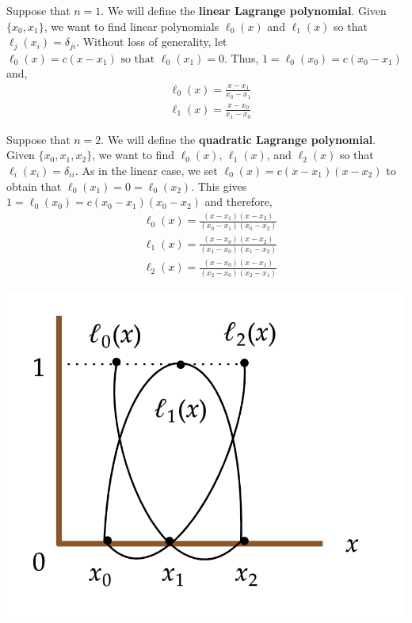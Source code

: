 \noindent Suppose that $n = 1$. We will define the \textbf{linear Lagrange polynomial}. Given $\{x_0, x_1\}$, we want to find linear polynomials $\ell_0(x)$ and $\ell_1(x)$ so that $\ell_j\left(x_i\right)=\delta_{j i}$. Without loss of generality, let $\ell_0(x)=c\left(x-x_1\right) \text { so that } \ell_0\left(x_1\right)=0$. Thus, $1=\ell_0\left(x_0\right)=c\left(x_0-x_1\right)$ and,
\begin{align*}
    &\ell_0(x)=\frac{x-x_1}{x_0-x_1} \\
    &\ell_1(x)=\frac{x-x_0}{x_1-x_0}
\end{align*}

\noindent \sloppy Suppose that $n = 2$. We will define the \textbf{quadratic Lagrange polynomial}. Given $\{x_0, x_1, x_2\}$, we want to find $\ell_0(x)$, $ \ell_1(x)$, and $ \ell_2(x)$ so that $\ell_i\left(x_i\right)=\delta_{i i}$. As in the linear case, we set $\ell_0(x)=c\left(x-x_1\right)\left(x-x_2\right)$ to obtain that $\ell_0\left(x_1\right)=0=\ell_0\left(x_2\right)$. This gives $1=\ell_0\left(x_0\right)=c\left(x_0-x_1\right)\left(x_0-x_2\right)$ and therefore,
\begin{align*}
    &\ell_0(x)=\frac{\left(x-x_1\right)\left(x-x_2\right)}{\left(x_0-x_1\right)\left(x_0-x_2\right)} \\
    &\ell_1(x)=\frac{\left(x-x_0\right)\left(x-x_2\right)}{\left(x_1-x_0\right)\left(x_1-x_2\right)} \\
    &\ell_2(x)=\frac{\left(x-x_0\right)\left(x-x_1\right)}{\left(x_2-x_0\right)\left(x_2-x_1\right)}
\end{align*}

\begin{marginfigure}
    \begin{center}
    \includegraphics[width=\textwidth]{figures/fig-10.png}
    \end{center}
\end{marginfigure}

